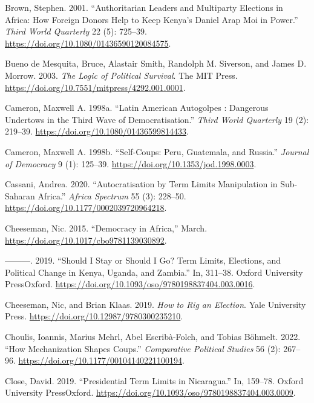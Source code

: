 \documentclass[
  12pt,
]{report}
\newlength{\cslhangindent}
\newenvironment{CSLReferences}[2] %
 {\begin{list}{}{%
  \setlength{\itemindent}{0pt}
  \setlength{\leftmargin}{0pt}
  \setlength{\parsep}{0pt}
  \ifodd #1
   \setlength{\leftmargin}{\cslhangindent}
   \setlength{\itemindent}{-1\cslhangindent}
  \fi
  \setlength{\itemsep}{#2\baselineskip}}}
 {\end{list}}
\begin{document}
\begin{CSLReferences}{1}{0}
Brown, Stephen. 2001. {``Authoritarian Leaders and Multiparty Elections
in Africa: How Foreign Donors Help to Keep Kenya's Daniel Arap Moi in
Power.''} \emph{Third World Quarterly} 22 (5): 725--39.
\url{https://doi.org/10.1080/01436590120084575}.

Bueno de Mesquita, Bruce, Alastair Smith, Randolph M. Siverson, and
James D. Morrow. 2003. \emph{The Logic of Political Survival}. The MIT
Press. \url{https://doi.org/10.7551/mitpress/4292.001.0001}.

Cameron, Maxwell A. 1998a. {``Latin American Autogolpes : Dangerous
Undertows in the Third Wave of Democratisation.''} \emph{Third World
Quarterly} 19 (2): 219--39.
\url{https://doi.org/10.1080/01436599814433}.

Cameron, Maxwell A. 1998b. {``Self-Coups: Peru, Guatemala, and
Russia.''} \emph{Journal of Democracy} 9 (1): 125--39.
\url{https://doi.org/10.1353/jod.1998.0003}.

Cassani, Andrea. 2020. {``Autocratisation by Term Limits Manipulation in
Sub-Saharan Africa.''} \emph{Africa Spectrum} 55 (3): 228--50.
\url{https://doi.org/10.1177/0002039720964218}.

Cheeseman, Nic. 2015. {``Democracy in Africa,''} March.
\url{https://doi.org/10.1017/cbo9781139030892}.

---------. 2019. {``Should I Stay or Should I Go? Term Limits,
Elections, and Political Change in Kenya, Uganda, and Zambia.''} In,
311--38. Oxford University PressOxford.
\url{https://doi.org/10.1093/oso/9780198837404.003.0016}.

Cheeseman, Nic, and Brian Klaas. 2019. \emph{How to Rig an Election}.
Yale University Press. \url{https://doi.org/10.12987/9780300235210}.

Choulis, Ioannis, Marius Mehrl, Abel Escribà-Folch, and Tobias Böhmelt.
2022. {``How Mechanization Shapes Coups.''} \emph{Comparative Political
Studies} 56 (2): 267--96.
\url{https://doi.org/10.1177/00104140221100194}.

Close, David. 2019. {``Presidential Term Limits in Nicaragua.''} In,
159--78. Oxford University PressOxford.
\url{https://doi.org/10.1093/oso/9780198837404.003.0009}.


\end{CSLReferences}
\end{document}
